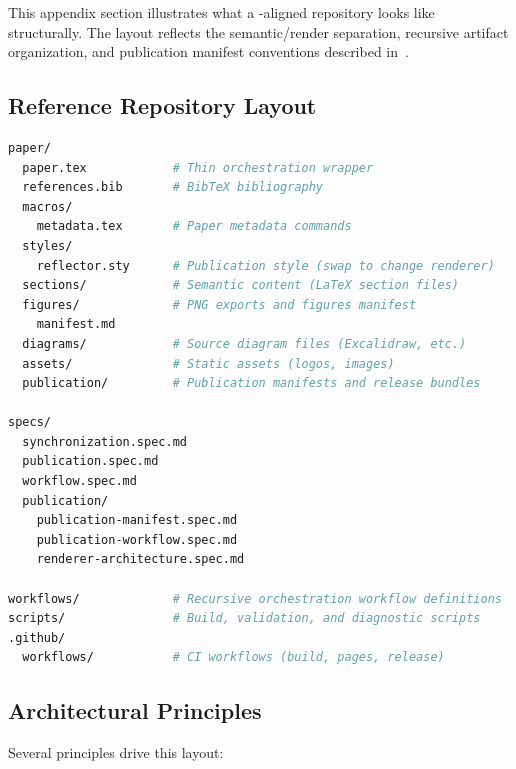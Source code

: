 This appendix section illustrates what a -aligned repository looks like structurally. The layout reflects the semantic/render separation, recursive artifact organization, and publication manifest conventions described in~.

\subsection{Reference Repository Layout}

\begin{lstlisting}[language=bash, caption={Reference repository architecture for a \reflector{}-aligned project.}, label={lst:repo-arch}]
paper/
  paper.tex            # Thin orchestration wrapper
  references.bib       # BibTeX bibliography
  macros/
    metadata.tex       # Paper metadata commands
  styles/
    reflector.sty      # Publication style (swap to change renderer)
  sections/            # Semantic content (LaTeX section files)
  figures/             # PNG exports and figures manifest
    manifest.md
  diagrams/            # Source diagram files (Excalidraw, etc.)
  assets/              # Static assets (logos, images)
  publication/         # Publication manifests and release bundles

specs/
  synchronization.spec.md
  publication.spec.md
  workflow.spec.md
  publication/
    publication-manifest.spec.md
    publication-workflow.spec.md
    renderer-architecture.spec.md

workflows/             # Recursive orchestration workflow definitions
scripts/               # Build, validation, and diagnostic scripts
.github/
  workflows/           # CI workflows (build, pages, release)
\end{lstlisting}

\subsection{Architectural Principles}

Several principles drive this layout:

